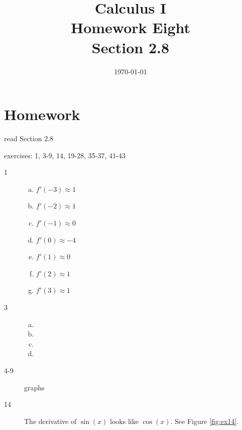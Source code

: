 \documentclass[letterpaper, landscape]{exam}
\title{Calculus I \\ Homework Eight \\ Section 2.8}
\author{}
\date{\today}
\begin{document}
  \maketitle

  \ifprintanswers
  \else
  \section{Homework}
    \begin{itemize*}
      \item read Section 2.8
      \item exercises: 1, 3-9, 14, 19-28, 35-37, 41-43
    \end{itemize*}
  \fi

  \ifprintanswers

    \begin{description}

      \item[1] 
        \begin{enumerate}[(a)]
          \item $f'(-3) \approx 1$
          \item $f'(-2) \approx 1$
          \item $f'(-1) \approx 0$
          \item $f'(0) \approx -4$
          \item $f'(1) \approx 0$
          \item $f'(2) \approx 1$
          \item $f'(3) \approx 1$
        \end{enumerate}

      \item[3] 
        \begin{enumerate}[(a)]
          \item {}
          \item {}
          \item {}
          \item {}
        \end{enumerate}

      \item[4-9] graphs

      \item[14]
        The derivative of $\sin(x)$ looks like $\cos(x)$. See Figure \ref{fig:ex14}.


\end{description}
\end{document}
